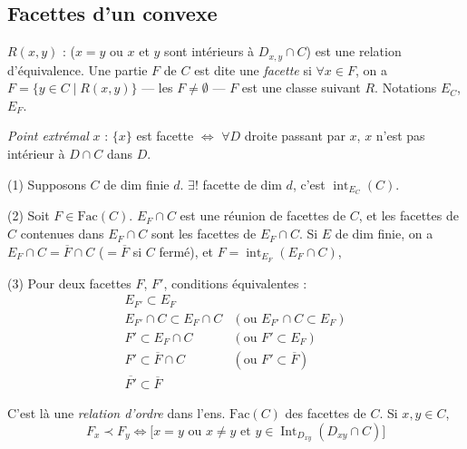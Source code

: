 \documentclass[11pt,a4paper]{article}
\begin{document}

\subsection{Facettes d'un convexe}

$R(x,y)$ : ($x = y$ ou $x$ et $y$ sont intérieurs à $D_{x,y} \cap C$) est une
relation d'équivalence. Une partie $F$ de $C$ est dite une \emph{facette} si
$\forall x \in F$, on a $F = \{ y \in C \mid R(x,y) \}$
---   les $F \neq \emptyset$
 --- $F$ est une classe suivant $R$. Notations
$E_C$, $E_F$.

\emph{Point extrémal} $x$ :  $\{x\}$ est facette
$\Leftrightarrow$ $\forall D$ droite passant par $x$, $x$ n'est pas intérieur
à $D \cap C$ dans $D$.

(1) Supposons $C$ de dim finie $d$. $\exists !$ facette de dim $d$, c'est
$\operatorname{int}_{E_C}(C)$.

(2) Soit $F \in \mathrm{Fac}(C)$.  $E_F \cap C$ est une réunion
de facettes de $C$, et \struck{\ill{}} les facettes de $C$ contenues dans
$E_F \cap C$ sont les facettes de $E_F \cap C$. Si $E$ de dim finie, on a
$E_F \cap C = \overline{F} \cap C$ ($= \overline{F}$ si $C$ fermé), et
$F = \operatorname{int}_{E_F}(E_F \cap C)$, 

(3) Pour deux facettes $F$, $F'$, conditions équivalentes :
\[
  \begin{array}{ll}
    E_{F'} \subset E_F & \\
    E_{F'} \cap C \subset E_F \cap C & (\text{ou } E_{F'} \cap C \subset E_F) \\
    F' \subset E_F \cap C & (\text{ou } F' \subset E_F) \\
    F' \subset \overline{F} \cap C & (\text{ou } F' \subset \overline{F}) \\
    \overline{F'} \subset \overline{F} &
  \end{array}
\]

C'est là une \emph{relation d'ordre} dans l'ens. $\mathrm{Fac}(C)$ des
facettes de $C$. Si $x, y \in C$, \struck{\ill{}}
\[
  F_x \prec F_y \Leftrightarrow
  \bigl[ x = y \text{ ou } x \neq y \text{ et }
  y \in \operatorname{Int}_{D_{xy}} (D_{xy} \cap C) \bigr]
\]
\end{document}
